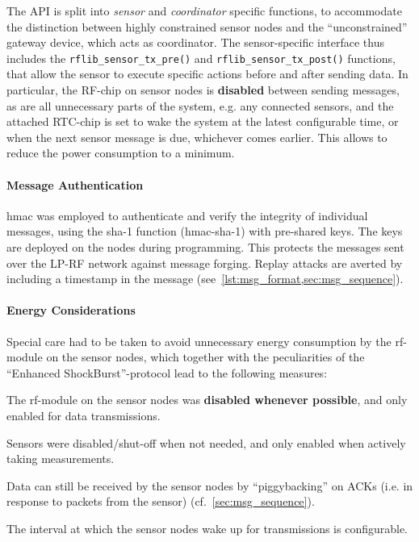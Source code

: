 The API is split into \textit{sensor} and \textit{coordinator} specific functions, to accommodate the distinction between highly constrained sensor nodes and the ``unconstrained'' gateway device, which acts as coordinator. The sensor-specific interface thus includes the \lstinline{rflib_sensor_tx_pre()} and \lstinline{rflib_sensor_tx_post()} functions, that allow the sensor to execute specific actions before and after sending data. In particular, the RF-chip on sensor nodes is \textbf{disabled} between sending messages, as are all unnecessary parts of the system, e.g. any connected sensors, and the attached RTC-chip is set to wake the system at the latest configurable time, or when the next sensor message is due, whichever comes earlier. This allows to reduce the power consumption to a minimum.


\paragraph{Message Authentication}
\label{sec:hmac}

\Gls{hmac} was employed to authenticate and verify the integrity of individual messages, using the \gls{sha}-1 function (\gls{hmac}-\gls{sha}-1) with pre-shared keys. The keys are deployed on the nodes during programming. This protects the messages sent over the LP-RF network against message forging. Replay attacks are averted by including a timestamp in the message (see~\cref{lst:msg_format,sec:msg_sequence}).


\paragraph{Energy Considerations}
Special care had to be taken to avoid unnecessary energy consumption by the \gls{rf}-module on the sensor nodes, which together with the peculiarities of the ``Enhanced ShockBurst''-protocol lead to the following measures:

\begin{compactitem}
  \item The \gls{rf}-module on the sensor nodes was \textbf{disabled whenever possible}, and only enabled for data transmissions.
  \item Sensors were disabled/shut-off when not needed, and only enabled when actively taking measurements.
  \item Data can still be received by the sensor nodes by ``piggybacking'' on ACKs (i.e. in response to packets from the sensor) (cf.~\cref{sec:msg_sequence}).
  \item The interval at which the sensor nodes wake up for transmissions is configurable.
\end{compactitem}


